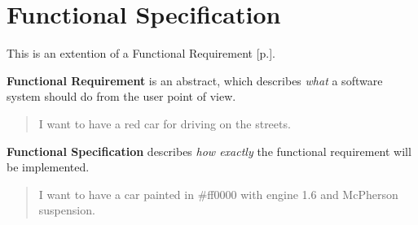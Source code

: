 \section{Functional Specification}
\label{sec:Functional Specification}

This is an extention of a Functional Requirement [p.\pageref{sec:Functional Requirement}].

\textbf{Functional Requirement} is an abstract, which describes \emph{what} a software system should do from the user point of view.

\begin{quote}
 I want to have a red car for driving on the streets.
\end{quote} 

\textbf{Functional Specification} describes \emph{how exactly} the functional requirement will be implemented.

\begin{quote}
 I want to have a car painted in \#ff0000 with engine 1.6 and McPherson suspension.
\end{quote} 